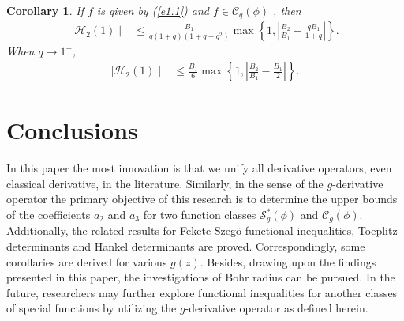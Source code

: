 \documentclass[11pt,twoside, reqno]{article}
\newtheorem{corollary}[theorem]{Corollary}
\theoremstyle{definition}
\begin{document}
\begin{corollary}
If $f$ is given by (\ref{e1.1}) and $f\in\mathcal{C}_{q}(\phi)$ , then
\begin{align}\nonumber
\mid \mathcal{H}_2(1)\mid &\leq \frac{B_{1}}{q(1+q)(1+q+q^{2})}\max\left\{1,\left|\frac{B_{2}}{B_{1}}-
\frac{qB_{1}}{1+q}\right|\right\}.
\end{align}
When $q\rightarrow1^{-}$,
\begin{align}\nonumber
\mid \mathcal{H}_2(1)\mid &\leq \frac{B_{1}}{6}\max\left\{1,\left|\frac{B_{2}}{B_{1}}-\frac{B_{1}}{2}\right|\right\}.
\end{align}
\end{corollary}


\section{ Conclusions }
\setcounter{equation}{0} \setcounter{theorem}{0}

In this paper the most innovation is that we unify all derivative operators, even classical derivative, in the literature. Similarly, in the sense of the $g$-derivative operator
the primary objective of this research is to determine the upper bounds of the coefficients $a_{2}$ and $a_{3}$ for two function classes $\mathcal{S}^{\ast }_{g}(\phi)$ and $\mathcal{C}_{g}(\phi)$. 
Additionally, the related results for Fekete-Szeg\"{o} functional inequalities, Toeplitz determinants and Hankel determinants are proved. Correspondingly, some corollaries are derived for various $g(z)$. Besides, drawing upon the findings presented in this paper, 
the investigations of Bohr radius can be pursued. In the future, researchers may further explore functional inequalities for another classes of special functions by utilizing the $g$-derivative operator as defined herein.


\end{document}
